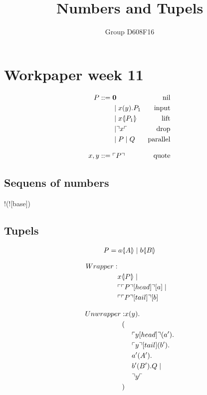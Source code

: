 

\author{Group D608F16}
\title{Numbers and Tupels}



\maketitle

\section{Workpaper week 11}

\begin{align*}
P  ::= \; &  \mathbf{0} & \text{nil} \\
  & \mid x(y).P_1 & \text{input} \\
  & \mid x \langle \! | P_1 | \! \rangle & \text{lift} \\
  & \mid \urcorner x \ulcorner & \text{drop} \\
  & \mid P \mid Q & \text{parallel} \\[3mm]
x,y ::= \; & \ulcorner P \urcorner & \text{quote}
\end{align*}
\citep{Meredith2005}
\subsection{Sequens of numbers}
!(![base]\para {})

\subsection{Tupels}
\begin{align*}
P=a \langle \! | A | \! \rangle\mid b \langle \! | B | \! \rangle
\end{align*}



\begin{align*}
Wrapper:
\\ & x \langle \! | P | \! \rangle\mid
\\ & \ulcorner \ulcorner P \urcorner[head] \urcorner[a]\mid
\\ & \ulcorner \ulcorner P \urcorner[tail] \urcorner[b]
\end{align*}

\begin{align*}
Unwrapper: &x(y).\\
(\\
&\quad \ulcorner y[head] \urcorner(a').\\
&\quad \ulcorner y \urcorner[tail](b').\\
&\quad a'(A').\\
&\quad b'(B').Q\mid\\
&\quad \urcorner y \ulcorner\\
)
\end{align*}




\grid
\grid
